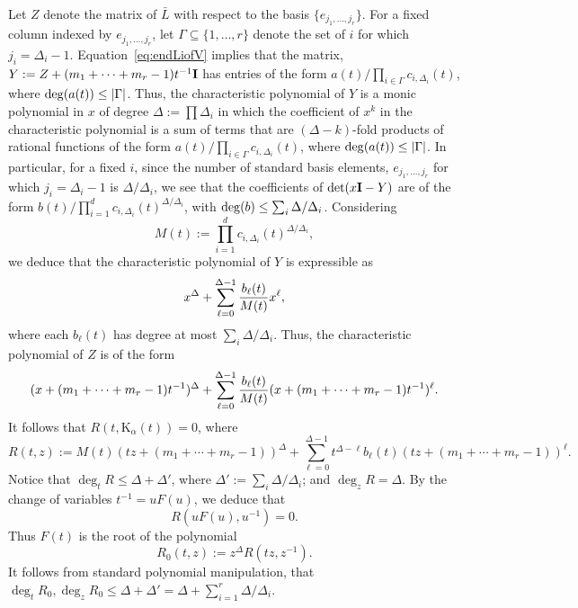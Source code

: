 \documentclass[11pt]{amsart}
\theoremstyle{definition}
\newcommand{\inv}[1]{#1^{-1}}
\newcommand{\invCT}{\mathrm{K}}
\begin{document}
Let $Z$ denote the matrix of $\bar{L}$ with respect to the basis $\{e_{j_1,\ldots ,j_r}\}$.  For a fixed column indexed by $e_{j_1,\ldots ,j_r}$, let $\Gamma\subseteq \{1,\ldots ,r\}$ denote the set of $i$ for which $j_i=\Delta_i-1$. Equation~\eqref{eq:endLiofV} implies that the matrix, $Y:=Z+(m_1+\cdots +m_r-1) \inv{t} {\bf I}$ has entries of the form $a(t)/\prod_{i\in \Gamma} c_{i,\Delta_i}(t)$, where ${\rm deg}(a(t)) \le |\Gamma|$. 
Thus, the characteristic polynomial of $Y$ is a monic polynomial in $x$ of degree $\Delta:=\prod \Delta_i$ in which the coefficient of $x^k$ in the characteristic polynomial is a sum of terms that are $(\Delta-k)$-fold products of rational functions of the form $a(t)/\prod_{i\in \Gamma} c_{i,\Delta_i}(t)$, where ${\rm deg}(a(t))\le |\Gamma|$.  In particular, for a fixed $i$, since the number of standard basis elements, $e_{j_1,\ldots ,j_r}$ for which $j_i=\Delta_i-1$ is $\Delta/\Delta_i$, we see that
the coefficients of $\det(x{\bf I}-Y)$ are of the form $b(t)/\prod_{i=1}^d c_{i,\Delta_i}(t)^{\Delta/\Delta_i}$, with ${\rm deg}(b) \le  \sum_i \Delta/\Delta_i$. Considering
$$M(t):=\prod_{i=1}^d c_{i,\Delta_i}(t)^{\Delta/\Delta_i},$$ we deduce that
the characteristic polynomial of $Y$ is expressible as 
$$x^{\Delta} + \sum_{\ell=0}^{\Delta-1} {b_{\ell}(t)\over M(t)} x^{\ell},$$ where each $b_{\ell}(t)$ has degree at most $\sum_i \Delta/\Delta_i$.
Thus, the characteristic polynomial of $Z$ is of the form 
$$(x+(m_1+\cdots +m_r-1) \inv{t})^{\Delta} + \sum_{\ell=0}^{\Delta-1} {b_{\ell}(t)\over M(t)} (x+(m_1+\cdots +m_r-1)\inv{t})^{\ell}.$$
It follows that $R(t,\invCT_{\alpha}(t))=0$, where 
$$R(t,z):=M(t) (tz+(m_1+\cdots +m_r-1))^{\Delta} + \sum_{\ell=0}^{\Delta-1} t^{\Delta-\ell} b_{\ell}(t) (tz+(m_1+\cdots +m_r-1))^{\ell}.$$
Notice that $\deg_t R\le \Delta+\Delta'$, where $\Delta':=\sum_i \Delta/\Delta_i$; and $\deg_z R = \Delta$. By the change of variables $\inv{t}=uF(u)$, we deduce that
$$R(uF(u),\inv{u})=0.$$  Thus $F(t)$ is the root of the polynomial 
$$R_0(t,z):= z^{\Delta}R(tz, z^{-1}).$$ 
 It follows from standard polynomial manipulation, that $\deg_t R_0, \deg_z R_0\le \Delta+\Delta' = \Delta+ \sum_{i=1}^r \Delta/\Delta_i$.
 
\end{document}
